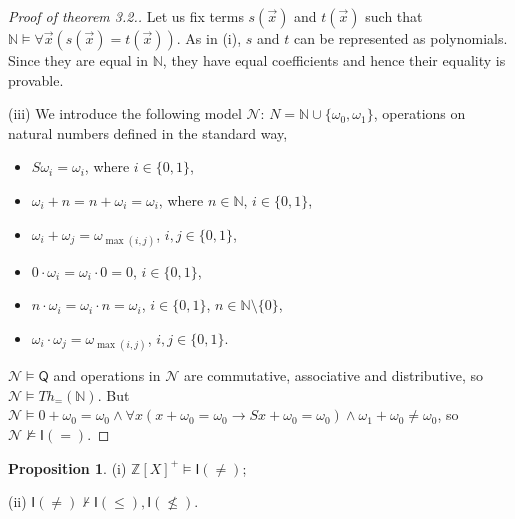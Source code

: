 \documentclass[a4paper,14pt]{article}
\theoremstyle{definition}
\theoremstyle{theorem}
\theoremstyle{lemma}
\theoremstyle{proposition}
\newtheorem{proposition}{Proposition}[section]
\theoremstyle{remark}
\theoremstyle{corollary}
\theoremstyle{problem}
\theoremstyle{hypothesis}
\begin{document}
\begin{proof}[Proof of theorem 3.2.]
    Let us fix terms $s(\vec x)$ and $t(\vec x)$ such that $\mathbb N \vDash \forall \vec x (s(\vec x) = t(\vec x))$. As in (i), $s$ and $t$ can be represented as polynomials. Since they are equal in $\mathbb N$, they have equal coefficients and hence their equality is provable.
    
    (iii) We introduce the following model $\mathcal N$: $N = \mathbb N \cup \{\omega_0, \omega_1\}$, operations on natural numbers defined in the standard way, 
    \begin{itemize}
        \item $S \omega_i = \omega_i$, where $i \in \{0, 1\}$,
        \item $\omega_i + n = n + \omega_i = \omega_i$, where $n \in \mathbb N$, $i \in \{0, 1\}$,
        \item $\omega_i + \omega_j = \omega_{\max(i, j)}$, $i, j \in \{0, 1\}$,
        \item $0 \cdot \omega_i = \omega_i \cdot 0 = 0$, $i \in \{0, 1\}$,
        \item $n \cdot \omega_i = \omega_i \cdot n = \omega_i$, $i \in \{0, 1\}$, $n \in \mathbb N \setminus \{0\}$,
        \item $\omega_i \cdot \omega_j = \omega_{\max(i, j)}$, $i, j \in \{0, 1\}$.
    \end{itemize}
    
    $\mathcal N \vDash \mathsf Q$ and operations in $\mathcal N$ are commutative, associative and distributive, so $\mathcal N \vDash Th_=(\mathbb N)$. But $\mathcal N \vDash 0 + \omega_0 = \omega_0 \wedge \forall x (x + \omega_0 = \omega_0 \rightarrow S x + \omega_0 = \omega_0) \wedge \omega_1 + \omega_0 \ne \omega_0$, so $\mathcal N \nvDash \mathsf I (=)$.
    
\end{proof}

\begin{proposition}
    (i) $\mathbb Z[X]^+ \vDash \mathsf{I}(\ne)$;
    
    (ii) $\mathsf I(\ne) \nvdash \mathsf I(\leqslant), \mathsf I(\nleqslant)$.
\end{proposition}
\end{document}
